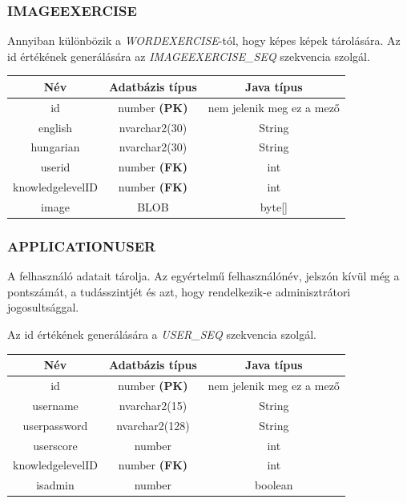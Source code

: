 \documentclass[11pt, a4paper]{article}
\begin{document}
    \subsubsection{IMAGEEXERCISE}
    Annyiban különbözik a \textit{WORDEXERCISE}-tól, hogy képes képek tárolására. Az id értékének generálására az \textit{IMAGEEXERCISE\_SEQ} szekvencia szolgál.
    
    \begin{table}[!h]
    	\centering
    	\begin{tabular} {|c|c|c|}
    		\hline
    		Név & Adatbázis típus & Java típus \\
    		\hline
    		id & number \textbf{(PK)} & nem jelenik meg ez a mező \\
    		english & nvarchar2(30) & String \\
    		hungarian & nvarchar2(30) & String \\
    		userid & number \textbf{(FK)} & int \\
    		knowledgelevelID & number \textbf{(FK)} & int \\
    		image & BLOB & byte[] \\
    		\hline
    	\end{tabular}
    \end{table}
    
    \subsubsection{APPLICATIONUSER}
    A felhasználó adatait tárolja. Az egyértelmű felhasználónév, jelszón kívül még a pontszámát, a tudásszintjét és azt, hogy rendelkezik-e adminisztrátori jogosultsággal.
    
    Az id értékének generálására a \textit{USER\_SEQ} szekvencia szolgál.
    
    \begin{table}[!h]
    	\centering
    	\begin{tabular} {|c|c|c|}
    		\hline
    		Név & Adatbázis típus & Java típus \\
    		\hline
    		id & number \textbf{(PK)} & nem jelenik meg ez a mező \\
    		username & nvarchar2(15) & String \\
    		userpassword & nvarchar2(128) & String \\
    		userscore & number & int \\
    		knowledgelevelID & number \textbf{(FK)} & int \\
    		isadmin & number & boolean \\
    		\hline
    	\end{tabular}
    \end{table}
    
\end{document}
